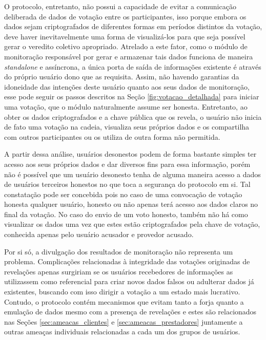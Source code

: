 %
O protocolo, entretanto, não possui a capacidade de evitar a comunicação deliberada de dados de votação entre os participantes, isso porque embora os dados sejam criptografados de diferentes formas em períodos distintos da votação, deve haver inevitavelmente uma forma de visualizá-los para que seja possível gerar o veredito coletivo apropriado. Atrelado a este fator, como o módulo de monitoração responsável por gerar e armazenar tais dados funciona de maneira \textit{standalone} e assíncrona, a única porta de saída de informações existente é através do próprio usuário dono que as requisita. Assim, não havendo garantias da idoneidade das intenções deste usuário quanto aos seus dados de monitoração, esse pode seguir os passos descritos na Seção \ref{fig:votacao_detalhada} para iniciar uma votação, que o módulo naturalmente assume ser honesta. Entretanto, ao obter os dados criptografados e a chave pública que os revela, o usuário não inicia de fato uma votação na cadeia, visualiza seus próprios dados e os compartilha com outros participantes ou os utiliza de outra forma não permitida.

%
A partir dessa análise, usuários desonestos podem de forma bastante simples ter acesso aos seus próprios dados e dar diversos fins para essa informação, porém não é possível que um usuário desonesto tenha de alguma maneira acesso a dados de usuários terceiros honestos no que toca a segurança do protocolo em si. Tal constatação pode ser concebida pois no caso de uma convocação de votação honesta qualquer usuário, honesto ou não apenas terá acesso aos dados claros no final da votação. No caso do envio de um voto honesto, também não há como visualizar os dados uma vez que estes estão criptografados pela chave de votação, conhecida apenas pelo usuário acusador e provedor acusado.

%
Por si só, a divulgação dos resultados de monitoração não representa um problema. Complicações relacionadas à integridade das votações originadas de revelações apenas surgiriam se os usuários recebedores de informações as utilizassem como referencial para criar novos dados falsos ou adulterar dados já existentes, buscando com isso dirigir a votação a um estado mais lucrativo. Contudo, o protocolo contém mecanismos que evitam tanto a forja quanto a emulação de dados mesmo com a presença de revelações e estes são relacionados nas Seções \ref{sec:ameacas_clientes} e \ref{sec:ameacas_prestadores} juntamente a outras ameaças individuais relacionadas a cada um dos grupos de usuários.


